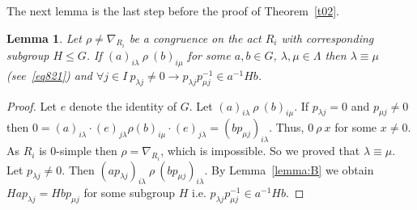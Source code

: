 \documentclass{birkau}
\numberwithin{equation}{section}
\theoremstyle{plain}
\newtheorem{lemma}[theorem]{Lemma}
\theoremstyle{definition}
\begin{document}
	The next lemma is the last step before the proof of Theorem~\ref{t02}.
	
	\begin{lemma} \label{lemma:C}
	    Let $\rho \neq \nabla_{R_i}$ be a congruence on the act $R_i$ with corresponding subgroup $H \leqslant G$. If $(a)_{i \lambda} \ \rho \ (b)_{i \mu}$ for some $a,b \in G$, $\lambda,\mu \in \Lambda $ then $\lambda \equiv \mu$ (see~\eqref{eq821}) and $\forall j \in I \ p_{\lambda j} \neq 0 \rightarrow p_{\lambda j} p_{\mu j}^{-1} \in a^{-1}Hb$.
	\end{lemma}
	\begin{proof}
	    Let $e$ denote the identity of $G$. Let $(a)_{i \lambda} \ \rho \ (b)_{i \mu}$. If $p_{\lambda j} = 0$ and $p_{\mu j} \neq 0$ then $0 = (a)_{i \lambda} \cdot (e)_{j \lambda} \rho (b)_{i \mu} \cdot (e)_{j \lambda} = (bp_{\mu j})_{i \lambda}$. Thus, $0 \ \rho \ x$ for some $x \neq 0$. As $R_i$ is 0-simple then $\rho = \nabla_{R_i}$, which is impossible. So we proved that $\lambda \equiv \mu$. Let $p_{\lambda j} \neq 0$. Then $(ap_{\lambda j})_{i \lambda} \ \rho \ (bp_{\mu j})_{i \lambda}.$ By Lemma~\ref{lemma:B} we obtain $Hap_{\lambda j} = Hbp_{\mu j}$ for some subgroup $H$ i.e. $p_{\lambda j} p_{\mu j}^{-1} \in a^{-1}Hb$.
	\end{proof}
	
\end{document}
